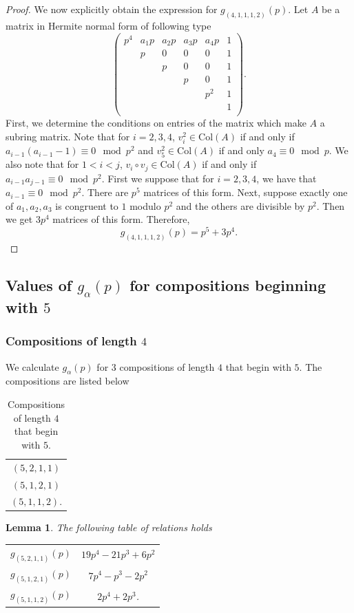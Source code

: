\documentclass[a4paper]{amsart}
\newtheorem{lemma}[theorem]{Lemma}
\numberwithin{equation}{section}
\theoremstyle{remark}
\renewcommand{\Col}{\mathrm{Col}}
\begin{document}
\begin{proof}
We now explicitly obtain the expression for $g_{(4,1,1,1,2)}(p)$. Let $A$ be a matrix in Hermite normal form of following type
$$
    \begin{pmatrix}
        p^4 & a_1p & a_2p & a_3p & a_4p & 1\\
         & p & 0 & 0 &  0 & 1\\
          & & p & 0 & 0 & 1\\
          &&& p & 0 & 1\\
          &&&& p^2& 1\\
          &&&&&1\\
    \end{pmatrix}.
    $$
    First, we determine the conditions on entries of the matrix which make $A$ a subring matrix. Note that for $i=2,3,4$, $v_i^2 \in \Col(A)$ if and only if $a_{i-1}(a_{i-1}-1) \equiv 0 \mod p^2$ and $v_5^2 \in \Col(A)$ if and only $a_4 \equiv 0 \mod p$. We also note that for $1<i<j$, $v_i\circ v_j \in \Col(A)$ if and only if $a_{i-1}a_{j-1} \equiv 0 \mod p^2$. First we suppose that for $i=2,3,4$, we have that $a_{i-1} \equiv 0 \mod p^2$. There are $p^5$ matrices of this form. Next, suppose exactly one of $a_1,a_2,a_3$ is congruent to $1$ modulo $p^2$ and the others are divisible by $p^2$. Then we get $3p^4$ matrices of this form. Therefore,
    \[g_{(4,1,1,1,2)}(p)=p^5+3p^4.\]
\end{proof}

\subsection{Values of $g_\alpha(p)$ for compositions beginning with $5$}
\subsubsection{Compositions of length $4$}We calculate $g_{\alpha}(p)$ for $3$ compositions of length $4$ that begin with $5$. The compositions are listed below\\
\begin{table}[H]
\centering
\begin{tabular}{c } 
\hline
$(5,2,1,1)$\\ 
$(5,1,2,1)$\\
$(5,1,1,2)$.\\
\hline
\end{tabular}
\caption{Compositions of length $4$ that begin with $5$.}
\end{table}
\begin{lemma}
The following table of relations holds
\begin{table}[H]
\centering
 \begin{tabular}{c c } 
 \hline
 $g_{(5,2,1,1)}(p)$ & $19p^4-21p^3+6p^2$\\
 $g_{(5,1,2,1)}(p)$ & $7 p^4 - p^3 - 2 p^2$\\
 $g_{(5,1,1,2)}(p)$ & $2p^4+2p^3$.\\
\hline
\end{tabular}
\end{table}
\end{lemma}
\end{document}
